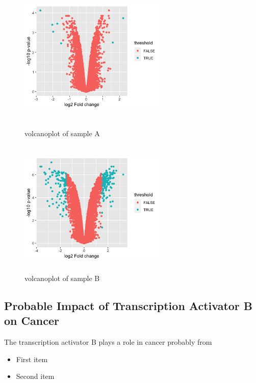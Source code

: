 \documentclass[fleqn,10pt]{wlscirep}
\begin{document}
\begin{figure}[h]
    \begin{minipage}[t]{0.45\linewidth}
    \centering
    \includegraphics[width=7cm,height=6.5cm]{sA.png}
    \caption{volcanoplot of sample A}
    \end{minipage}
    \begin{minipage}[t]{0.45\linewidth}        %
    \hspace{2mm}
    \includegraphics[width=7cm,height=6.5cm]{sB.png}
    \caption{volcanoplot of sample B}
    \end{minipage}
\end{figure}

\subsection*{Probable Impact of Transcription Activator B on Cancer}
The transcription activator B plays a role in cancer probably from 

\begin{itemize}
\item First item
\item Second item
\end{itemize}
\end{document}
